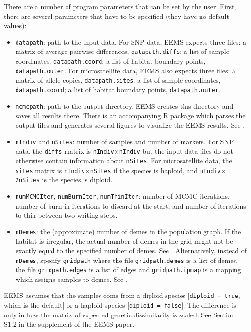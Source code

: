\documentclass[a4paper,10pt,DIV=15,titlepage,mpinclude=true]{scrartcl}
\newcommand{\keystring}[1]{{\tt #1}}
\begin{document}
There are a number of program parameters that can be set by the user. First, there are several parameters that have to be specified (they have no default values):
\begin{itemize}
  \item \keystring{datapath}: path to the input data. For SNP data, EEMS expects three files: a matrix of average pairwise differences, \keystring{datapath.diffs}; a list of sample coordinates, \keystring{datapath.coord}; a list of habitat boundary points, \keystring{datapath.outer}. For microsatellite data, EEMS also expects three files: a matrix of allele copies, \keystring{datapath.sites}; a list of sample coordinates, \keystring{datapath.coord}; a list of habitat boundary points, \keystring{datapath.outer}.
  \item \keystring{mcmcpath}: path to the output directory. EEMS creates this directory and saves all results there. There is an accompanying R package which parses the output files and generates several figures to visualize the EEMS results. See .
  \item \keystring{nIndiv} and \keystring{nSites}: number of samples and number of markers. For SNP data, the \keystring{diffs} matrix is \keystring{nIndiv}$\times$\keystring{nIndiv} but the input data files do not otherwise contain information about \keystring{nSites}. For microsatellite data, the \keystring{sites} matrix is \keystring{nIndiv}$\times$\keystring{nSites} if the species is haploid, and \keystring{nIndiv}$\times$\keystring{2nSites} is the species is diploid.
  \item \keystring{numMCMCIter}, \keystring{numBurnIter}, \keystring{numThinIter}: number of MCMC iterations, number of burn-in iterations to discard at the start, and number of iterations to thin between two writing steps.
  \item \keystring{nDemes}: the (approximate) number of demes in the population graph. If the habitat is irregular, the actual number of demes in the grid might not be exactly equal to the specified number of demes. See . Alternatively, instead of \keystring{nDemes}, specify \keystring{gridpath} where the file \keystring{gridpath.demes} is a list of demes, the file \keystring{gridpath.edges} is a list of edges and \keystring{gridpath.ipmap} is a mapping which assigns samples to demes. See .
\end{itemize}

EEMS assumes that the samples come from a diploid species [\keystring{diploid = true}, which is the default] or a haploid species [\keystring{diploid = false}]. The difference is only in how the matrix of expected genetic dissimilarity is scaled. See Section S1.2 in the supplement of the EEMS paper.
\end{document}
